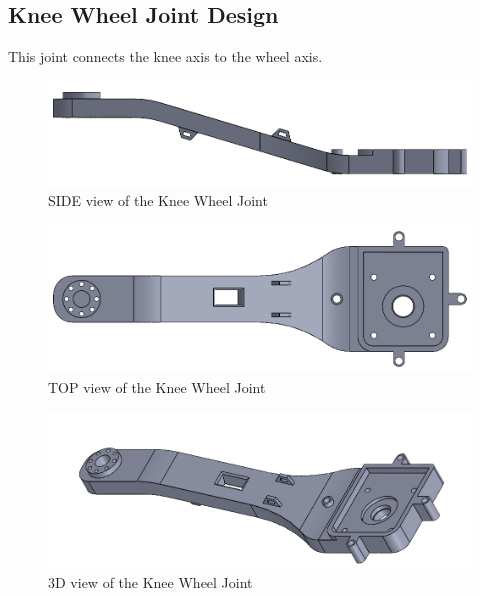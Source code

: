 \subsection{Knee Wheel Joint Design}
This joint connects the knee axis to the wheel axis.
\begin{figure}[h]
	\centering
	\includegraphics[width=1\linewidth]{Wheel_Knee_Joint_1}
	\caption[SIDE view of the Knee Wheel Joint]{SIDE view of the Knee Wheel Joint}
	\label{fig:wheelkneejoint1}
\end{figure}
\begin{figure}[h]
	\centering
	\includegraphics[width=1\linewidth]{Wheel_Knee_Joint_2}
	\caption[TOP view of the Knee Wheel Joint]{TOP view of the Knee Wheel Joint}
	\label{fig:wheelkneejoint2}
\end{figure}
\begin{figure}[h]
	\centering
	\includegraphics[width=1\linewidth]{Wheel_Knee_Joint_3}
	\caption[3D view of the Knee Wheel Joint]{3D view of the Knee Wheel Joint}
	\label{fig:wheelkneejoint3}
\end{figure}




